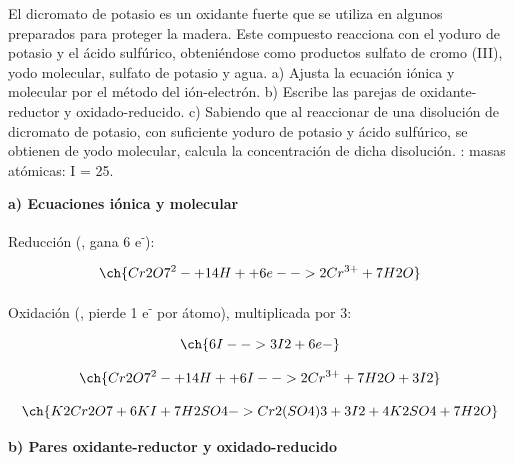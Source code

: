 \begin{exerciseEVAU}
    El dicromato de potasio es un oxidante fuerte que se utiliza en algunos preparados para proteger la madera. Este compuesto reacciona con el yoduro de potasio y el ácido sulfúrico, obteniéndose como productos sulfato de cromo (III), yodo molecular, sulfato de potasio y agua. a) Ajusta la ecuación iónica y molecular por el método del ión-electrón. b) Escribe las parejas de oxidante-reductor y oxidado-reducido. c) Sabiendo que al reaccionar   de una disolución de dicromato de potasio, con suficiente yoduro de potasio y ácido sulfúrico, se obtienen  de yodo molecular, calcula la concentración de dicha disolución.
    \datos{}: masas atómicas: I = 25.

    \begin{solu}


        \textbf{a) Ecuaciones iónica y molecular}

        Reducción (, gana 6 e\textsuperscript{-}):

        \begin{equation*}
            \ch{Cr2O7^2- + 14 H+ + 6 e- -> 2 Cr^{3+} + 7 H2O}
        \end{equation*}

        Oxidación (, pierde 1 e\textsuperscript{-} por átomo), multiplicada por 3:

        \begin{equation*}
            \ch{6 I- -> 3 I2 + 6 e-}
        \end{equation*}

        \begin{equation*}
            \ch{Cr2O7^2- + 14 H+ + 6 I- -> 2 Cr^{3+} + 7 H2O + 3 I2}
        \end{equation*}

        \begin{equation*}
            \ch{K2Cr2O7 + 6 KI + 7 H2SO4 -> Cr2(SO4)3 + 3 I2 + 4 K2SO4 + 7 H2O}
        \end{equation*}

        \textbf{b) Pares oxidante-reductor y oxidado-reducido}


\end{solu}
\end{exerciseEVAU}
